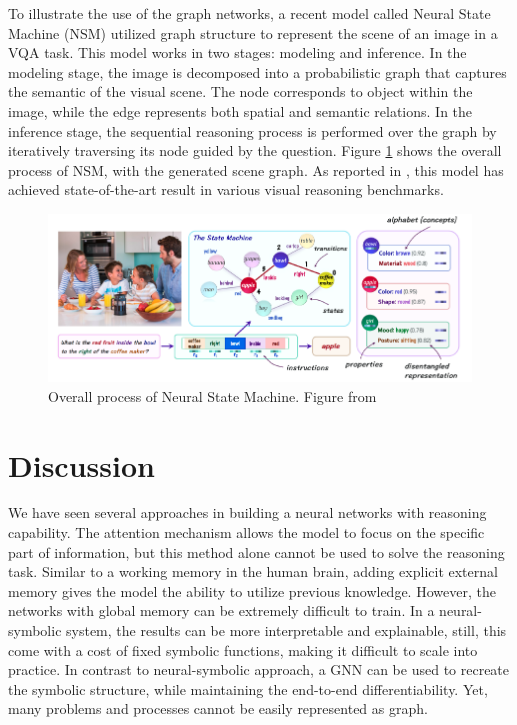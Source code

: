 \documentclass[journal]{IEEEtran}
\begin{document}
To illustrate the use of the graph networks, a recent model called Neural State Machine (NSM) \cite{hudson2019learning} utilized graph structure to represent the scene of an image in a VQA task.
This model works in two stages: modeling and inference. 
In the modeling stage, the image is decomposed into a probabilistic graph that captures the semantic of the visual scene.
The node corresponds to object within the image, while the edge represents both spatial and semantic relations.
In the inference stage, the sequential reasoning process is performed over the graph by iteratively traversing its node guided by the question.
Figure \ref{nsm} shows the overall process of NSM, with the generated scene graph.
As reported in \cite{hudson2019learning}, this model has achieved state-of-the-art result in various visual reasoning benchmarks.

\begin{figure}[htb]
  \includegraphics[width=\linewidth]{NSM.png}
  \caption{Overall process of Neural State Machine. Figure from \cite{hudson2019learning}}
  \label{nsm}
\end{figure}

\section{Discussion}

We have seen several approaches in building a neural networks with reasoning capability.
The attention mechanism allows the model to focus on the specific part of information, 
but this method alone cannot be used to solve the reasoning task.
Similar to a working memory in the human brain, 
adding explicit external memory gives the model the ability to utilize previous knowledge.
However, the networks with global memory can be extremely difficult to train. 
In a neural-symbolic system, the results can be more interpretable and explainable,
still, this come with a cost of fixed symbolic functions, making it difficult to scale into practice.
In contrast to neural-symbolic approach, a GNN can be used to recreate the symbolic structure, 
while maintaining the end-to-end differentiability. Yet, many problems and processes cannot be easily represented as graph.
\end{document}

